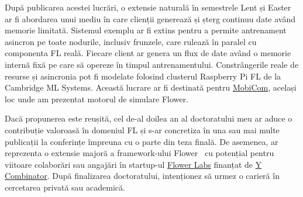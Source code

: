 După publicarea acestei lucrări, o extensie naturală în semestrele Lent și Easter ar fi abordarea unui mediu în care clienții generează și șterg continuu date având memorie limitată. Sistemul exemplu ar fi extins pentru a permite antrenament asincron pe toate nodurile, inclusiv frunzele, care rulează în paralel cu componenta FL reală. Fiecare client ar genera un flux de date având o memorie internă fixă pe care să opereze în timpul antrenamentului. Constrângerile reale de resurse și asincronia pot fi modelate folosind clusterul Raspberry Pi FL de la Cambridge ML Systems. Această lucrare ar fi destinată pentru \href{https://sigmobile.org/mobicom/2023/}{MobiCom}, același loc unde am prezentat motorul de simulare Flower.

Dacă propunerea este reușită, cel de-al doilea an al doctoratului meu ar aduce o contribuție valoroasă în domeniul FL și s-ar concretiza în una sau mai multe publicații la conferințe împreuna cu o parte din teza finală. De asemenea, ar reprezenta o extensie majoră a framework-ului Flower~\citep{Flower} cu potențial pentru viitoare colaborări sau angajări în startup-ul \href{https://flower.dev/blog/2023-03-08-flower-labs/}{Flower Labs} finanțat de \href{https://www.ycombinator.com/}{Y Combinator}. După finalizarea doctoratului, intenționez să urmez o carieră în cercetarea privată sau academică.